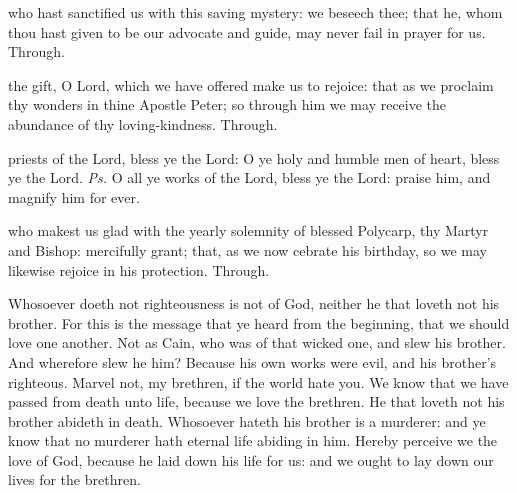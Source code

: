  who hast sanctified us with this saving mystery: we beseech thee; that he, whom thou hast given to be our advocate and guide, may never fail in prayer for us. Through.

 the gift, O Lord, which we have offered make us to rejoice: that as we proclaim thy wonders in thine Apostle Peter; so through him we may receive the abundance of thy loving-kindness. Through.



\introit
{} priests of the Lord, bless ye the Lord: O ye holy and humble men of heart, bless ye the Lord. \textit{Ps.} O all ye works of the Lord, bless ye the Lord: praise him, and magnify him for ever.

\vspace{-0.25\baselineskip}

\collect

\vspace{-0.1\baselineskip}

 who makest us glad with the yearly solemnity of blessed Polycarp, thy Martyr and Bishop: mercifully grant; that, as we now cebrate his birthday, so we may likewise rejoice in his protection. Through.

 Whosoever doeth not righteousness is not of God, neither he that loveth not his brother. For this is the message that ye heard from the beginning, that we should love one another. Not as Cain, who was of that wicked one, and slew his brother. And wherefore slew he him? Because his own works were evil, and his brother's righteous. Marvel not, my brethren, if the world hate you. We know that we have passed from death unto life, because we love the brethren. He that loveth not his brother abideth in death. Whosoever hateth his brother is a murderer: and ye know that no murderer hath eternal life abiding in him. Hereby perceive we the love of God, because he laid down his life for us: and we ought to lay down our lives for the brethren.


\tractnotice


